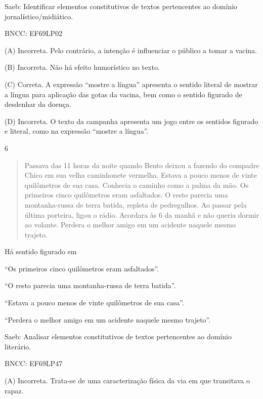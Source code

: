 Saeb: Identificar elementos constitutivos de textos pertencentes ao
domínio jornalístico/midiático.

BNCC: EF69LP02

(A) Incorreta. Pelo contrário, a intenção é influenciar o público a
tomar a vacina.

(B) Incorreta. Não há efeito humorístico no texto.

(C) Correta. A expressão ``mostre a língua'' apresenta o sentido literal
de mostrar a língua para aplicação das gotas da vacina, bem como o
sentido figurado de desdenhar da doença.

(D) Incorreta. O texto da campanha apresenta um jogo entre os sentidos
figurado e literal, como na expressão ``mostre a língua''.

\num{6}

\begin{quote}
Passava das 11 horas da noite quando Bento deixou a fazendo do compadre
Chico em sua velha caminhonete vermelha. Estava a pouco menos de vinte
quilômetros de sua casa. Conhecia o caminho como a palma da mão. Os
primeiros cinco quilômetros eram asfaltados. O resto parecia uma
montanha-russa de terra batida, repleta de pedregulhos. Ao passar pela
última porteira, ligou o rádio. Acordara às 6 da manhã e não queria
dormir ao volante. Perdera o melhor amigo em um acidente naquele mesmo
trajeto.
\end{quote}


Há sentido figurado em

\begin{escolha}
\item ``Os primeiros cinco quilômetros eram asfaltados''.

\item ``O resto parecia uma montanha-russa de terra batida''.

\item ``Estava a pouco menos de vinte quilômetros de sua casa''.

\item ``Perdera o melhor amigo em um acidente naquele mesmo trajeto''.
\end{escolha}

Saeb: Analisar elementos constitutivos de textos pertencentes ao domínio
literário.

BNCC: EF69LP47

(A) Incorreta. Trata-se de uma caracterização física da via em que
transitava o rapaz.


